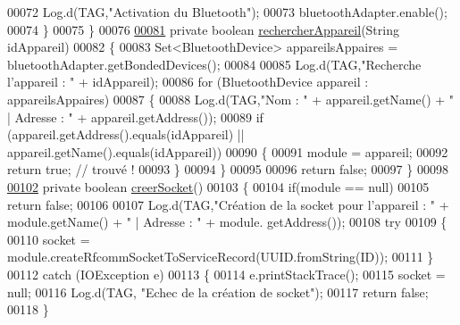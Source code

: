 \begin{DoxyCode}
00072             Log.d(TAG,\textcolor{stringliteral}{"Activation du Bluetooth"});
00073             bluetoothAdapter.enable();
00074         \}
00075     \}
00076 
\hyperlink{classcom_1_1example_1_1area_1_1_liaison_bluetooth_a47786b43e054a81e08356cd22b4cb37e}{00081}     \textcolor{keyword}{private} \textcolor{keywordtype}{boolean} \hyperlink{classcom_1_1example_1_1area_1_1_liaison_bluetooth_a47786b43e054a81e08356cd22b4cb37e}{rechercherAppareil}(String idAppareil)
00082     \{
00083         Set<BluetoothDevice> appareilsAppaires = bluetoothAdapter.getBondedDevices();
00084 
00085         Log.d(TAG,\textcolor{stringliteral}{"Recherche l'appareil : "} + idAppareil);
00086         \textcolor{keywordflow}{for} (BluetoothDevice appareil : appareilsAppaires)
00087         \{
00088             Log.d(TAG,\textcolor{stringliteral}{"Nom : "} + appareil.getName() + \textcolor{stringliteral}{" | Adresse : "} + appareil.getAddress());
00089             \textcolor{keywordflow}{if} (appareil.getAddress().equals(idAppareil) || appareil.getName().equals(idAppareil))
00090             \{
00091                 module = appareil;
00092                 \textcolor{keywordflow}{return} \textcolor{keyword}{true}; \textcolor{comment}{// trouvé !}
00093             \}
00094         \}
00095 
00096         \textcolor{keywordflow}{return} \textcolor{keyword}{false};
00097     \}
00098 
\hyperlink{classcom_1_1example_1_1area_1_1_liaison_bluetooth_a69ea46dca5a0690d5d8231731ae60d9f}{00102}     \textcolor{keyword}{private} \textcolor{keywordtype}{boolean} \hyperlink{classcom_1_1example_1_1area_1_1_liaison_bluetooth_a69ea46dca5a0690d5d8231731ae60d9f}{creerSocket}()
00103     \{
00104         \textcolor{keywordflow}{if}(module == null)
00105             \textcolor{keywordflow}{return} \textcolor{keyword}{false};
00106 
00107         Log.d(TAG,\textcolor{stringliteral}{"Création de la socket pour l'appareil : "} + module.getName() + \textcolor{stringliteral}{" | Adresse : "} + module.
      getAddress());
00108         \textcolor{keywordflow}{try}
00109         \{
00110             socket = module.createRfcommSocketToServiceRecord(UUID.fromString(ID));
00111         \}
00112         \textcolor{keywordflow}{catch} (IOException e)
00113         \{
00114             e.printStackTrace();
00115             socket = null;
00116             Log.d(TAG, \textcolor{stringliteral}{"Echec de la création de socket"});
00117             \textcolor{keywordflow}{return} \textcolor{keyword}{false};
00118         \}

\end{DoxyCode}
